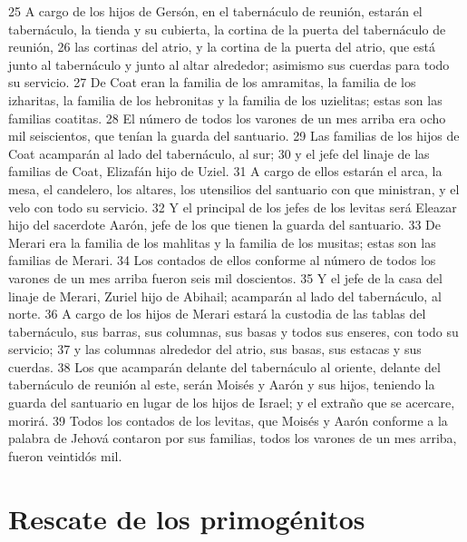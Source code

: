 25 A cargo de los hijos de Gersón, en el tabernáculo de reunión, estarán el tabernáculo, la tienda y su cubierta, la cortina de la puerta del tabernáculo de reunión,
26 las cortinas del atrio, y la cortina de la puerta del atrio, que está junto al tabernáculo y junto al altar alrededor; asimismo sus cuerdas para todo su servicio.
27 De Coat eran la familia de los amramitas, la familia de los izharitas, la familia de los hebronitas y la familia de los uzielitas; estas son las familias coatitas.
28 El número de todos los varones de un mes arriba era ocho mil seiscientos, que tenían la guarda del santuario.
29 Las familias de los hijos de Coat acamparán al lado del tabernáculo, al sur;
30 y el jefe del linaje de las familias de Coat, Elizafán hijo de Uziel.
31 A cargo de ellos estarán el arca, la mesa, el candelero, los altares, los utensilios del santuario con que ministran, y el velo con todo su servicio.
32 Y el principal de los jefes de los levitas será Eleazar hijo del sacerdote Aarón, jefe de los que tienen la guarda del santuario.
33 De Merari era la familia de los mahlitas y la familia de los musitas; estas son las familias de Merari.
34 Los contados de ellos conforme al número de todos los varones de un mes arriba fueron seis mil doscientos.
35 Y el jefe de la casa del linaje de Merari, Zuriel hijo de Abihail; acamparán al lado del tabernáculo, al norte.
36 A cargo de los hijos de Merari estará la custodia de las tablas del tabernáculo, sus barras, sus columnas, sus basas y todos sus enseres, con todo su servicio;
37 y las columnas alrededor del atrio, sus basas, sus estacas y sus cuerdas.
38 Los que acamparán delante del tabernáculo al oriente, delante del tabernáculo de reunión al este, serán Moisés y Aarón y sus hijos, teniendo la guarda del santuario en lugar de los hijos de Israel; y el extraño que se acercare, morirá.
39 Todos los contados de los levitas, que Moisés y Aarón conforme a la palabra de Jehová contaron por sus familias, todos los varones de un mes arriba, fueron veintidós mil.
\section*{Rescate de los primogénitos}

